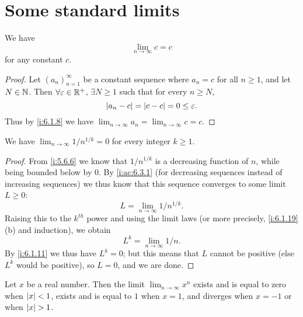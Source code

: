 \section{Some standard limits}\label{i:sec:6.5}

\begin{ac}\label{i:ac:6.5.1}
  We have
  \[
    \lim_{n \to \infty} c = c
  \]
  for any constant \(c\).
\end{ac}

\begin{proof}
  Let \((a_n)_{n = 1}^\infty\) be a constant sequence where \(a_n = c\) for all \(n \geq 1\), and let \(N \in \mathbb{N}\).
  Then \(\forall \varepsilon \in \mathbb{R}^+\), \(\exists N \geq 1\) such that for every \(n \geq N\),
  \[
    \left\lvert a_n - c\right\rvert = \left\lvert c - c\right\rvert = 0 \leq \varepsilon.
  \]
  Thus by \cref{i:6.1.8} we have \(\lim_{n \to \infty} a_n = \lim_{n \to \infty} c = c\).
\end{proof}

\begin{cor}\label{i:6.5.1}
  We have \(\lim_{n \to \infty} 1 / n^{1 / k} = 0\) for every integer \(k \geq 1\).
\end{cor}

\begin{proof}
  From \cref{i:5.6.6} we know that \(1 / n^{1 / k}\) is a decreasing function of \(n\), while being bounded below by \(0\).
  By \cref{i:ac:6.3.1} (for decreasing sequences instead of increasing sequences) we thus know that this sequence converges to some limit \(L \geq 0\):
  \[
    L = \lim_{n \to \infty} 1 / n^{1 / k}.
  \]
  Raising this to the \(k^{th}\) power and using the limit laws (or more precisely, \cref{i:6.1.19}(b) and induction), we obtain
  \[
    L^k = \lim_{n \to \infty} 1 / n.
  \]
  By \cref{i:6.1.11} we thus have \(L^k = 0\);
  but this means that \(L\) cannot be positive (else \(L^k\) would be positive), so \(L = 0\), and we are done.
\end{proof}

\begin{lem}\label{i:6.5.2}
  Let \(x\) be a real number.
  Then the limit \(\lim_{n \to \infty} x^n\) exists and is equal to zero when \(\left\lvert x\right\rvert < 1\), exists and is equal to \(1\) when \(x = 1\), and diverges when \(x = -1\) or when \(\left\lvert x\right\rvert > 1\).
\end{lem}


